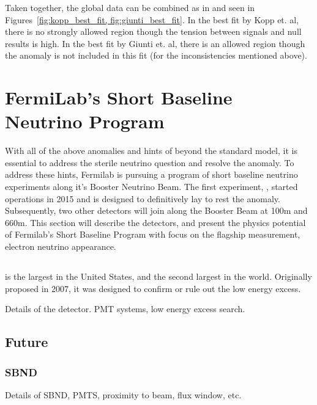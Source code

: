 Taken together, the global data can be combined as in \cite{kopp_best_fit,giunti_best_fit} and seen in Figures~\ref{fig:kopp_best_fit, fig:giunti_best_fit}.  In the best fit by Kopp et. al, there is no strongly allowed region though the tension between signals and null results is high.  In the best fit by Giunti et. al, there is an allowed region though the \MB anomaly is not included in this fit (for the inconsistencies mentioned above).


\section{FermiLab's Short Baseline Neutrino Program}

With all of the above anomalies and hints of beyond the standard model, it is essential to address the sterile neutrino question and resolve the \MB anomaly.  To address these hints, Fermilab is pursuing a program of short baseline neutrino experiments along it's Booster Neutrino Beam.  The first experiment, \uboone, started operations in 2015 and is designed to definitively lay to rest the \MB anomaly.  Subsequently, two other detectors will join \uboone along the Booster Beam at 100m and 660m.  This section will describe the detectors, and present the physics potential of Fermilab's Short Baseline Program with focus on the flagship measurement, electron neutrino appearance.

\subsection{\uboone}

\uboone is the largest \lartpc in the United States, and the second largest in the world.  Originally proposed in 2007, it was designed to confirm or rule out the \MB low energy excess.

Details of the \uboone detector.  PMT systems, low energy excess search.

\subsection{Future \lartpcs}

\subsubsection{SBND}

Details of SBND, PMTS, proximity to beam, flux window, etc.

\subsubsection{\icarus}

